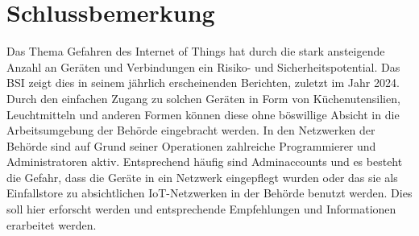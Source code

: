 \documentclass[12pt, a4paper, onecolumn, oneside, toc=bibliographynumbered, liststotoc]{scrartcl} %
\begin{document}
	\section{Schlussbemerkung}
Das Thema Gefahren des Internet of Things hat durch die stark ansteigende Anzahl an Geräten und Verbindungen ein Risiko- und Sicherheitspotential. Das BSI zeigt dies in seinem jährlich erscheinenden Berichten, zuletzt im Jahr 2024. Durch den einfachen Zugang zu solchen Geräten in Form von Küchenutensilien, Leuchtmitteln und anderen Formen können diese ohne böswillige Absicht in die Arbeitsumgebung der Behörde eingebracht werden. In den Netzwerken der Behörde sind auf Grund seiner Operationen zahlreiche Programmierer und Administratoren aktiv. Entsprechend häufig sind Adminaccounts und es besteht die Gefahr, dass die Geräte in ein Netzwerk eingepflegt wurden oder das sie als Einfallstore zu absichtlichen IoT-Netzwerken in der Behörde benutzt werden.
Dies soll hier erforscht werden und entsprechende Empfehlungen und Informationen erarbeitet werden.

	\nocite{*}
	\printbibliography
\end{document}
